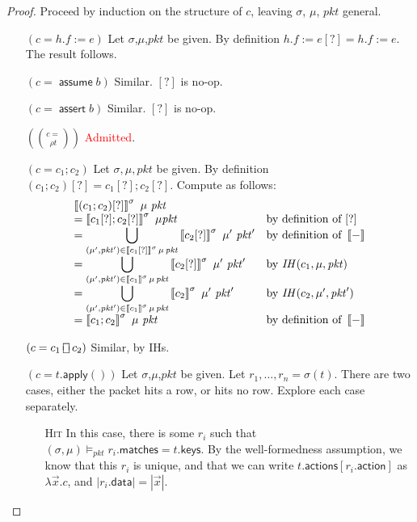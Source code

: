 \documentclass{article}
\newcommand{\pkt}{\mathit{pkt}}
\newcommand{\denote}[1]{\left\llbracket#1\right\rrbracket}
\newcommand{\matches}{\mathsf{matches}}
\newcommand{\action}{\mathsf{action}}
\newcommand{\actions}{\mathsf{actions}}
\newcommand{\keys}{\mathsf{keys}}
\newcommand{\data}{\mathsf{data}}
\newcommand{\assert}{\mathop{\mathsf{assert}}}
\newcommand{\assume}{\mathop{\mathsf{assume}}}
\newcommand{\apply}{\mathsf{apply}}
\newcommand{\choiceop}{\rotatebox[origin=c]{90}{$\sqsubset\!\!\!\sqsupset$}}
\newcommand{\choice}{\mathbin{\choiceop}}
\newcommand{\satisfy}[3]{({#1,#3}) \models_{#2}}
\begin{document}
\begin{proof}
  Proceed by induction on the structure of $c$, leaving $\sigma$, $\mu$, $\pkt$ general.
  \begin{enumerate}[align=left]
  \item[$(c = h.f := e)$]
    Let $\sigma$,$\mu$,$\pkt$ be given.
    By definition $h.f:=e[?] = h.f:=e$. The result follows.
  \item[$(c = \assume b)$] Similar. $[?]$ is no-op.
  \item[$(c = \assert b)$] Similar. $[?]$ is no-op.
  \item[$(c = \choose \rho t)$] \textcolor{red}{Admitted}.
  \item[$(c = c_1;c_2)$]
    Let $\sigma,\mu,\pkt$ be given.
    By definition $(c_1;c_2)[?] = c_1[?]; c_2[?]$.
    Compute as follows:
    \[\begin{array}{>{\displaystyle}ll}
    \denote{(c_1;c_2)[?]}^\sigma~\mu~\pkt \\
    = \denote{c_1[?];c_2[?]}^\sigma~\mu\pkt
    & \text{by definition of } [?]  \\
    = \bigcup_{(\mu',\pkt') \in \denote{c_1[?]}^\sigma\,\mu\,\pkt}\denote{c_2[?]}^\sigma~\mu'~\pkt'
    & \text{by definition of }\denote{-} \\
    = \bigcup_{(\mu',\pkt') \in \denote{c_1}^\sigma\,\mu\,\pkt}\denote{c_2[?]}^\sigma~\mu'~\pkt'
    & \text{by } \mathit{IH}(c_1, \mu, \pkt) \\
    = \bigcup_{(\mu',\pkt') \in \denote{c_1}^\sigma\,\mu\,\pkt}\denote{c_2}^\sigma~\mu'~\pkt'
    & \text{by } \mathit{IH}(c_2, \mu', \pkt') \\
    = \denote{c_1;c_2}^\sigma~\mu~\pkt
    & \text{by definition of } \denote{-}
    \end{array}
    \]
  \item[$(c = c_1 \choice c_2)$] Similar, by IHs.

  \item[$(c = t.\apply())$]
    Let $\sigma$,$\mu$,$\pkt$ be given.
    Let $r_1,\ldots,r_n = \sigma(t)$.
    There are two cases, either the packet hits a row, or hits no row. Explore each case separately.
    \begin{enumerate}
    \item[\textsc{Hit}] In this case, there is some $r_i$ such that $\satisfy \sigma \pkt \mu r_i.\matches = t.\keys$. By the well-formedness assumption,
      we know that this $r_i$ is unique, and that we can write
      $t.\actions[r_i.\action]$ as $\lambda \vec x. c$, and $|r_i.\data| = |\vec x|$.


\end{enumerate}
\end{enumerate}
\end{proof}
\end{document}
